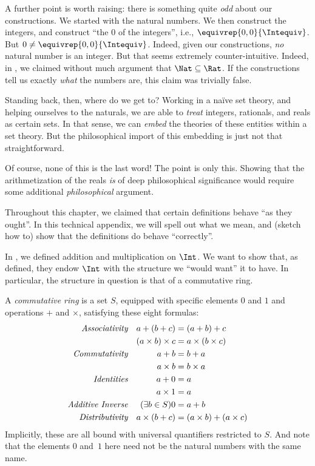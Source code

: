A further point is worth raising: there is something quite \emph{odd}
about our constructions. We started with the natural numbers. We then
construct the integers, and construct ``the $0$ of the integers'',
i.e., $ \equivrep{0,0}{\Intequiv}$. But $0 \neq
\equivrep{0,0}{\Intequiv}$. Indeed,  given our constructions,
\emph{no} natural number is an integer. But that seems extremely
counter-intuitive. Indeed, in , we claimed
without much argument that $\Nat \subseteq \Rat$. If the constructions
tell us exactly \emph{what} the numbers are, this claim was trivially
false. 

Standing back, then, where do we get to? Working in a na\"ive set
theory, and helping ourselves to the naturals, we are able to
\emph{treat} integers, rationals, and reals as certain sets. In that
sense, we can \emph{embed} the theories of these entities within a set
theory. But the philosophical import of this embedding is just not
that straightforward. 

Of course, none of this is the last word!{} The point is only this.
Showing that the arithmetization of the reals \emph{is} of deep
philosophical significance would require some additional
\emph{philosophical} argument.







	

Throughout this chapter, we claimed that certain definitions behave
``as they ought''. In this technical appendix, we will spell out what
we mean, and (sketch how to) show that the definitions do behave
``correctly''. 

In , we defined addition and multiplication on $\Int$.
We want to show that, as defined, they endow $\Int$ with the structure
we ``would want'' it to have. In particular, the structure in question
is that of a commutative ring.

\begin{defn}
	A \emph{commutative ring} is a set $S$, equipped with specific elements $0$ and $1$ and operations $+$ and $\times$, satisfying these eight formulas:
	\begin{align*}
		\emph{Associativity}&&a + (b+ c) & = (a + b) + c \\
		&& (a \times b) \times c & = a \times (b\times c)\\
		\emph{Commutativity}&&a + b &= b+ a  \\
		&&  a \times b&= b\times a\\ 
		\emph{Identities}&&a + 0 &= a \\
		&& a \times 1 &= a\\
		\emph{Additive Inverse}&&(\exists b\in S)0&=a + b\\
		\emph{Distributivity}&&a \times (b+ c ) &= (a \times b) + (a \times c)
	\end{align*}
	Implicitly, these are all bound with universal quantifiers restricted to $S$. And note that the elements $0$ and~$1$ here need not be the natural numbers with the same name.
\end{defn}


